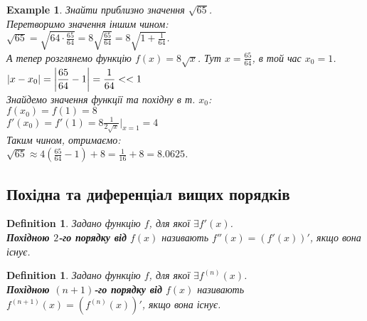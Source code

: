 \documentclass[a4paper, 14pt]{article}
\theoremstyle{theoremdd}
\theoremstyle{theoremdd}
\newtheorem{definition}[theorem]{Definition}
\theoremstyle{theoremdd}
\theoremstyle{theoremdd}
\newtheorem{example}[theorem]{Example}
\theoremstyle{theoremdd}
\theoremstyle{theoremdd}
\theoremstyle{theoremdd}
\theoremstyle{theoremdd}
\begin{document}
\begin{example}
Знайти приблизно значення $\sqrt{65}$.\\
Перетворимо значення іншим чином:\\
$\sqrt{65} \displaystyle = \sqrt{64 \cdot \frac{65}{64}} = 8 \sqrt{\frac{65}{64}} = 8 \sqrt{1 + \frac{1}{64}}$.\\
А тепер розглянемо функцію $f(x) = 8\sqrt{x}$. Тут $x = \displaystyle \frac{65}{64}$, в той час $x_0 = 1$.\\
$|x-x_0| = \displaystyle \abs{\frac{65}{64} - 1} = \frac{1}{64} <<1$\\
Знайдемо значення функції та похідну в т. $x_0$:\\
$f(x_0) = f(1) = 8$\\
$f'(x_0) = f'(1) = \displaystyle 8\frac{1}{2 \sqrt{x}} |_{x = 1} = 4$\\
Таким чином, отримаємо:\\
$\sqrt{65} \approx \displaystyle 4\left(\frac{65}{64}-1\right)+8 = \frac{1}{16} + 8 = 8.0625$.
\end{example}

\subsection{Похідна та диференціал вищих порядків}
\begin{definition}
Задано функцію $f$, для якої $\exists f'(x)$.\\
\textbf{Похідною $2$-го порядку від} $f(x)$ називають $f''(x) = (f'(x))'$, якщо вона існує.
\end{definition}

\begin{definition}
Задано функцію $f$, для якої $\exists f^{(n)}(x)$.\\
\textbf{Похідною $(n+1)$-го порядку від} $f(x)$ називають $f^{(n+1)}(x) = (f^{(n)}(x))'$, якщо вона існує.
\end{definition}
\end{document}
